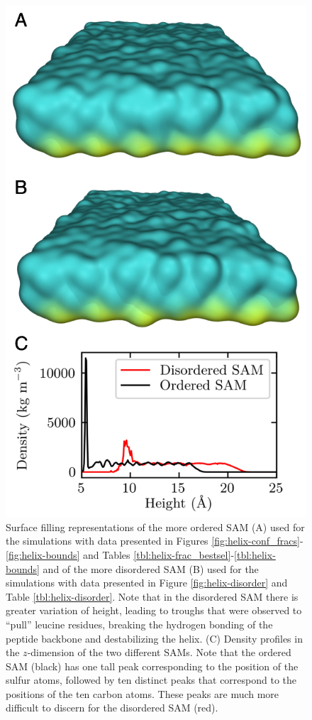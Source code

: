 \begin{figure}
    \center
    \includegraphics[width=\single]{figures-helix/order_figures.png}
    \caption{
        Surface filling representations of the more ordered SAM (A) used for the simulations with data presented in Figures \ref{fig:helix-conf_fracs}-\ref{fig:helix-bounds} and Tables \ref{tbl:helix-frac_bestsel}-\ref{tbl:helix-bounds} and of the more disordered SAM (B) used for the simulations with data presented in Figure \ref{fig:helix-disorder} and Table \ref{tbl:helix-disorder}. 
        Note that in the disordered SAM there is greater variation of height, leading to troughs that were observed to ``pull'' leucine residues, breaking the hydrogen bonding of the peptide backbone and destabilizing the helix. 
        (C) Density profiles in the $z$-dimension of the two different SAMs. 
        Note that the ordered SAM (black) has one tall peak corresponding to the position of the sulfur atoms, followed by ten distinct peaks that correspond to the positions of the ten carbon atoms. 
        These peaks are much more difficult to discern for the disordered SAM (red).
    }
    \label{fig:helix-disordered_sam}
\end{figure}

